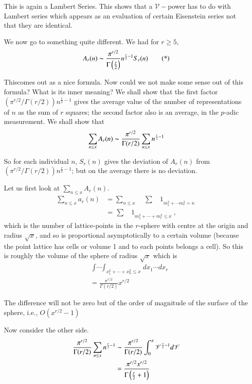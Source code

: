 This is again a Lambert Series. This shows that a $\mathscr{V}-$power
has to do with Lambert series which appears as an evaluation of
certain Eisenstein series not that they are identical.

We now go to something quite different. We had for $r \geq 5$,
\begin{equation*}
  A_r (n) \thicksim \frac{\pi^{r/2}}{\Gamma\left(\frac{r}{2} \right)}
  n^{\frac{r}{2}-1} S_r (n) \tag{*}\label{part4:lec41:eq*}
\end{equation*}

This\pageoriginale comes out as a nice formula. Now could we not
make some sense out of this formula? What is its inner meaning? We
shall show that the first factor $\left( \pi^{r/2}/ \Gamma
(r/2)\right)n^{\frac{r}{2}-1}$ gives the average value of the number
of representations of $n$ as the sum of $r$ squares; the second factor
also is an average, in the $p$-adic measurement. We shall show that
$$
\sum_{n \leq x} A_r (n) \thicksim \frac{\pi^{r/2}}{\Gamma (r/2)}
\sum_{n \leq x} n^{\frac{r}{2}-1}
$$

So for each individual $n$, $S_r (n)$ gives the deviation of $A_r(n)$
from \break $\left(\pi^{r/2}/\Gamma(r/2) \right)n^{\frac{r}{2}-1}$; but on
the average there is no deviation. 

Let us first look at $\sum_{n \leq x} A_r (n)$.
\begin{align*}
  \sum_{n \leq x} a_r (n) & = \sum_{n \leq x} \quad \mathop{\sum\quad
    1}_{m_1^2 + \cdots m_r^2=n}\\
  & = \mathop{\sum\quad 1}_{m_1^2 + \cdots + m_r^2 \leq x},
\end{align*}
which is the number of lattice-points in the $r$-sphere with centre at
the origin and radius $\sqrt{x}$, and so is proportional asymptotically
to a certain volume (because the point lattice has cells or volume 1
and to each points belongs a cell). So this is roughly the volume of
the sphere of radius $\sqrt{x}$ which is 
\begin{align*}
  & \mathop{\int \cdots\int}_{x_1^2 + \cdots + x_n^2 \leq x} dx_1 \cdots
  dx_r\\
  & = \frac{\pi^{r/2}}{\Gamma(r/2)}x^{r/2}
\end{align*}\pageoriginale

The difference will not be zero but of the order of magnitude of the
surface of the sphere, i.e., $O \left( x^{r/2}-1\right)$

Now consider the other side.
\begin{align*}
  \frac{\pi^{r/2}}{\Gamma (r/2)} \sum_{n \leq x} n^{\frac{r}{2}-1} &
  \thicksim \frac{\pi^{r/2}}{\Gamma(r/2)} \int_0^x
  \mathscr{V}^{\frac{r}{2}-1} d \mathscr{V}\\
  & = \frac{\pi^{r/2} x^{r/2}}{\Gamma\left(\frac{r}{2} +1 \right)} 
\end{align*}

